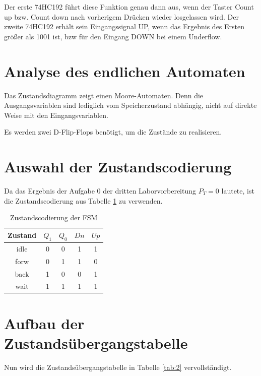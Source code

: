 \documentclass[
    paper=a4,
]{scrartcl}
\newcommand{\edit}[1]{\textcolor{colorred}{#1}}
\begin{document}
    Der erste 74HC192 führt diese Funktion genau dann aus, wenn der Taster Count up bzw. Count down nach vorherigem Drücken wieder losgelassen wird.
    Der zweite 74HC192 erhält sein Eingangssignal UP, wenn das Ergebnis des Ersten größer als 1001 ist, bzw für den Eingang DOWN bei einem Underflow.

\section{Analyse des endlichen Automaten}
    Das Zustandsdiagramm zeigt einen Moore-Automaten. Denn die Ausgangsvariablen sind lediglich vom Speicherzustand abhängig, nicht auf direkte Weise mit den Eingangsvariablen. 

    Es werden zwei D-Flip-Flops benötigt, um die Zustände zu realisieren.

\section{Auswahl der Zustandscodierung}
    Da das Ergebnis der Aufgabe 0 der dritten Laborvorbereitung \(P_T=0\) lautete, ist die Zustandscodierung aus Tabelle \ref{tab:1} zu verwenden.

    \begin{table}
        \centering
        \caption{Zustandscodierung der FSM}
        \label{tab:1}
        \begin{tabular}{ccccc}\toprule
            Zustand &   $Q_1$   &   $Q_0$   &   \edit{$Dn$} &   \edit{$Up$} \\\midrule
            idle    &   0       &   0       &   \edit{1}   &   \edit{1} \\
            forw    &   \edit{0}&   1       &   \edit{1}   &   \edit{0} \\
            back    &   1       &   0       &   \edit{0}   &   \edit{1} \\
            wait    &   1       &   1       &   \edit{1}   &   \edit{1} \\\bottomrule
        \end{tabular}
    \end{table}

\section{Aufbau der Zustandsübergangstabelle}
    Nun wird die Zustandsübergangstabelle in Tabelle \ref{tab:2} vervollständigt. 
\end{document}
